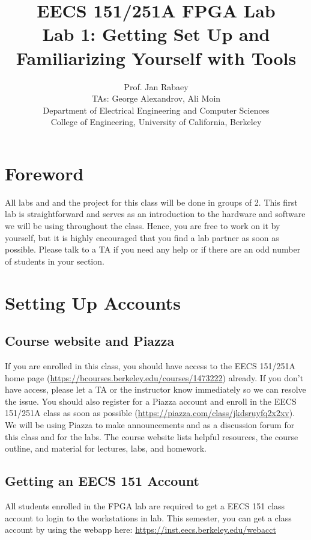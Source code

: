 \documentclass[11pt]{article}
\begin{document}
\title{EECS 151/251A FPGA Lab\\
Lab 1: Getting Set Up and Familiarizing Yourself with Tools}

\author{Prof. Jan Rabaey \\
TAs: George Alexandrov, Ali Moin \\Department of Electrical Engineering and Computer Sciences\\
College of Engineering, University of California, Berkeley}
\date{}
\maketitle

\section{Foreword}
All labs and and the project for this class will be done in groups of 2. This first lab is straightforward and serves as an introduction to the hardware and software we will be using throughout the class. Hence, you are free to work on it by yourself, but it is highly encouraged that you find a lab partner as soon as possible. Please talk to a TA if you need any help or if there are an odd number of students in your section.

\section{Setting Up Accounts}

\subsection{Course website and Piazza}
If you are enrolled in this class, you should have access to the EECS 151/251A home page (\url{https://bcourses.berkeley.edu/courses/1473222}) already. If you don't have access, please let a TA or the instructor know immediately so we can resolve the issue. You should also register for a Piazza account and enroll in the EECS 151/251A class as soon as possible (\url{https://piazza.com/class/jkdsruyfq2x2xv}). We will be using Piazza to make announcements and as a discussion forum for this class and for the labs. The course website lists helpful resources, the course outline, and material for lectures, labs, and homework.

\subsection{Getting an EECS 151 Account}
All students enrolled in the FPGA lab are required to get a EECS 151 class account to login to the workstations in lab. This semester, you can get a class account by using the webapp here:
\url{https://inst.eecs.berkeley.edu/webacct}
\end{document}
